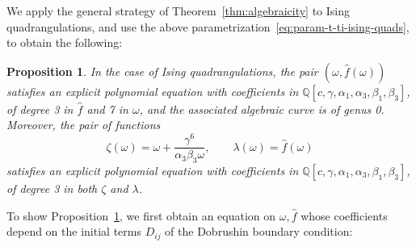 \documentclass{scrartcl}
\newcommand{\Q}{\mathbb{Q}}
\newcommand\wh[1]{\widehat{#1}}
\newtheorem{prop}[thm]{Proposition}
\begin{document}
We apply the general strategy of Theorem~\ref{thm:algebraicity} to Ising quadrangulations, and use the above parametrization~\eqref{eq:param-t-ti-ising-quads}, to obtain the following:
\begin{prop}
In the case of Ising quadrangulations, the pair $(\omega, \wh{f}(\omega))$ satisfies an explicit polynomial equation with coefficients in $\Q[c, \gamma, \alpha_1, \alpha_3, \beta_1,\beta_3]$, of degree 3 in $\wh{f}$ and 7 in $\omega$, and the associated algebraic curve is of genus 0. Moreover, the pair of functions
\[
\zeta(\omega)=\omega+\frac{\gamma^6}{\alpha_3\beta_3\omega}, \qquad \lambda(\omega)=\wh{f}(\omega)
\]
satisfies an explicit polynomial equation with coefficients in $\Q[c, \gamma, \alpha_1, \alpha_3, \beta_1,\beta_3]$, of degree 3 in both $\zeta$ and $\lambda$.
\label{prop:eqs-ising-q-non-sym-final}
\end{prop}

To show Proposition~\ref{prop:eqs-ising-q-non-sym-final}, we first obtain an equation on $\omega, \wh{f}$ whose coefficients depend on the initial terms $D_{ij}$ of the Dobrushin boundary condition:
\end{document}
